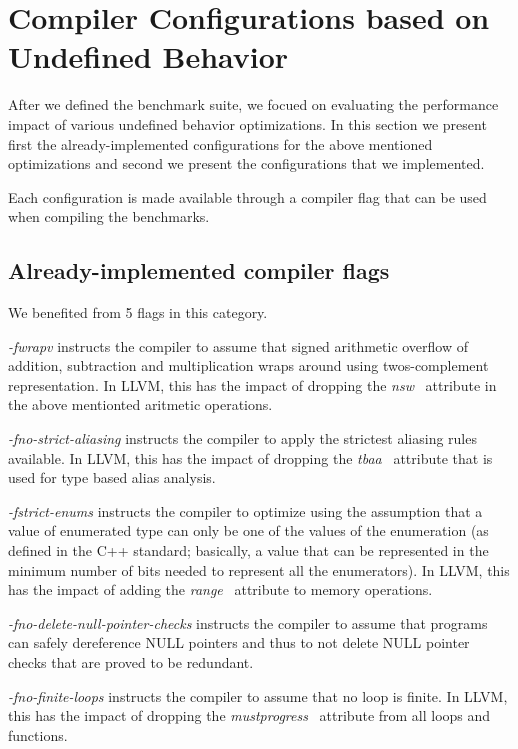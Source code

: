 \section{Compiler Configurations based on Undefined Behavior} \label{sec:flags}

After we defined the benchmark suite, we focued on evaluating the performance
impact of various undefined behavior optimizations. In this section we present
first the already-implemented configurations for the above mentioned
optimizations and second we present the configurations that we implemented.

Each configuration is made available through a compiler flag that can be used
when compiling the benchmarks.

\subsection{Already-implemented compiler flags}

We benefited from 5 flags in this category.

\textit{-fwrapv} instructs the compiler to assume that signed arithmetic
overflow of addition, subtraction and multiplication wraps around using
twos-complement representation. In LLVM, this has the impact of dropping the
\textit{nsw}~\cite{nsw-def} attribute in the above mentionted aritmetic
operations.

\textit{-fno-strict-aliasing} instructs the compiler to apply the strictest
aliasing rules available. In LLVM, this has the impact of dropping the
\textit{tbaa}~\cite{tbaa-def} attribute that is used for type based alias
analysis.

\textit{-fstrict-enums} instructs the compiler to optimize using the assumption
that a value of enumerated type can only be one of the values of the enumeration
(as defined in the C++ standard; basically, a value that can be represented in
the minimum number of bits needed to represent all the enumerators). In LLVM,
this has the impact of adding the \textit{range}~\cite{range-def} attribute to
memory operations.

\textit{-fno-delete-null-pointer-checks} instructs the compiler to assume that
programs can safely dereference NULL pointers and thus to not delete NULL
pointer checks that are proved to be redundant.

\textit{-fno-finite-loops} instructs the compiler to assume that no loop is
finite. In LLVM, this has the impact of dropping the
\textit{mustprogress}~\cite{mustprogress-def} attribute from all loops and
functions.

